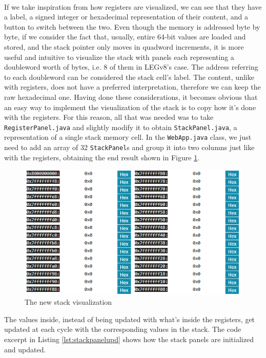 \paragraph{}
If we take inspiration from how registers are visualized, we can see that they have a label, a signed integer or hexadecimal representation of their content, and a button to switch between the two. Even though the memory is addressed byte by byte, if we consider the fact that, usually, entire 64-bit values are loaded and stored, and the stack pointer only moves in quadword increments, it is more useful and intuitive to visualize the stack with panels each representing a doubleword worth of bytes, i.e. 8 of them in LEGv8's case. The address referring to each doubleword can be considered the stack cell's label. The content, unlike with registers, does not have a preferred interpretation, therefore we can keep the raw hexadecimal one. Having done these considerations, it becomes obvious that an easy way to implement the visualization of the stack is to copy how it's done with the registers. For this reason, all that was needed was to take \verb|RegisterPanel.java| and slightly modify it to obtain \verb|StackPanel.java|, a representation of a single stack memory cell. In the \verb|WebApp.java| class, we just need to add an array of 32 \verb|StackPanel|s and group it into two columns just like with the registers, obtaining the end result shown in Figure \ref{fig:stackregs}.
\begin{figure}[H]
    \centering
    \includegraphics[width=0.85\linewidth]{img/stack_vis.png}
    \caption{The new stack visualization}
    \label{fig:stackregs}
\end{figure}
The values inside, instead of being updated with what's inside the registers, get updated at each cycle with the corresponding values in the stack. The code excerpt in Listing \ref{lst:stackpanelupd} shows how the stack panels are initialized and updated.
